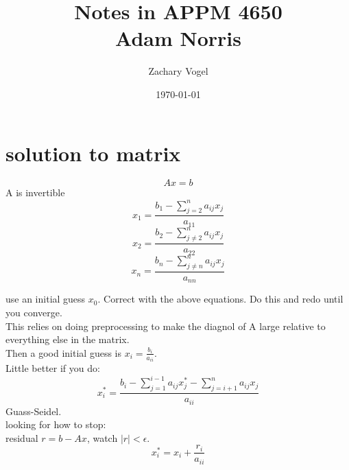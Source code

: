 \documentclass{article}
\begin{document}
\author{Zachary Vogel}
\date{\today}
\title{Notes in APPM 4650\\Adam Norris}

\maketitle



\section{solution to matrix}
\[Ax=b\]
A is invertible\\
\[x_1=\frac{b_1-\sum_{j=2}^na_{ij}x_j}{a_{11}}\]
\[x_2=\frac{b_2-\sum_{j\neq 2}^na_{ij}x_j}{a_{22}}\]
\[x_n=\frac{b_n-\sum_{j\neq n}^na_{ij}x_j}{a_{nn}}\]

use an initial guess $x_0$. Correct with the above equations. Do this and redo until you converge.\\
This relies on doing preprocessing to make the diagnol of A large relative to everything else in the matrix.\\
Then a good initial guess is $x_i=\frac{b_i}{a_{ii}}$.\\
Little better if you do:
\[x_i^*=\frac{b_i-\sum_{j=1}^{i-1}a_{ij}x_j^*-\sum_{j=i+1}^na_{ij}x_j}{a_{ii}}\]
Guass-Seidel.\\
looking for how to stop:\\
residual $r=b-Ax$, watch $\lvert r\rvert<\epsilon$.\\

\[x_i^*=x_i+\frac{r_i}{a_{ii}}\]
\end{document}
